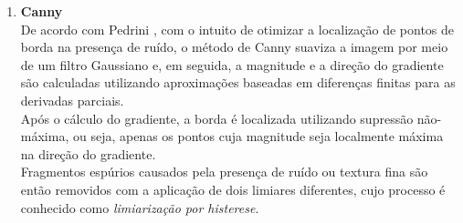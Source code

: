 \documentclass[12pt]{article}
\begin{document}
\begin{itemize}
\begin{itemize}
\begin{enumerate}[label*=\arabic*.]
    \item \textbf{Canny}\\
    De acordo com Pedrini \cite{pedrini2008analise}, com o intuito de otimizar a localização de pontos de borda na presença de ruído, o método de Canny suaviza a imagem por meio de um filtro Gaussiano e, em seguida, a magnitude e a direção do gradiente são calculadas utilizando aproximações baseadas em diferenças finitas para as derivadas parciais.\\
    Após o cálculo do gradiente, a borda é localizada utilizando supressão não-máxima, ou seja, apenas os pontos cuja magnitude seja localmente máxima na direção do gradiente.\\
    Fragmentos espúrios causados pela presença de ruído ou textura fina são então removidos com a aplicação de dois limiares diferentes, cujo processo é conhecido como \textit{limiarização por histerese}.

\end{enumerate}

\end{itemize}
\end{itemize}
\clearpage

\printbibliography
\end{document}
